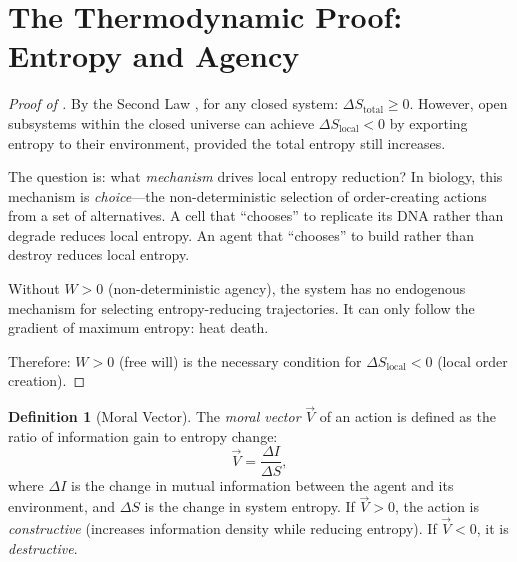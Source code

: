 \documentclass[12pt, a4paper]{article}
\theoremstyle{plain}
\theoremstyle{definition}
\newtheorem{definition}[theorem]{Definition}
\begin{document}
\section{The Thermodynamic Proof: Entropy and Agency}\label{sec:thermo}

\begin{proof}[Proof of ]
  By the Second Law \citep{Clausius1865}, for any closed system:
  $\Delta S_{\text{total}} \geq 0$. However, open subsystems within the
  closed universe can achieve $\Delta S_{\text{local}} < 0$ by exporting
  entropy to their environment, provided the total entropy still increases.

  The question is: what \emph{mechanism} drives local entropy reduction?
  In biology, this mechanism is \emph{choice}---the non-deterministic
  selection of order-creating actions from a set of alternatives. A cell
  that ``chooses'' to replicate its DNA rather than degrade reduces local
  entropy. An agent that ``chooses'' to build rather than destroy reduces
  local entropy.

  Without $W > 0$ (non-deterministic agency), the system has no endogenous
  mechanism for selecting entropy-reducing trajectories. It can only follow
  the gradient of maximum entropy: heat death.

  Therefore: $W > 0$ (free will) is the necessary condition for
  $\Delta S_{\text{local}} < 0$ (local order creation). \qedhere
\end{proof}

\begin{definition}[Moral Vector]\label{def:moral_vector}
  The \emph{moral vector} $\vec{V}$ of an action is defined as the ratio
  of information gain to entropy change:
  \begin{equation}\label{eq:moral_vector}
    \vec{V} = \frac{\Delta I}{\Delta S},
  \end{equation}
  where $\Delta I$ is the change in mutual information between the agent
  and its environment, and $\Delta S$ is the change in system entropy.
  If $\vec{V} > 0$, the action is \emph{constructive} (increases information
  density while reducing entropy). If $\vec{V} < 0$, it is \emph{destructive}.
\end{definition}

\end{document}
